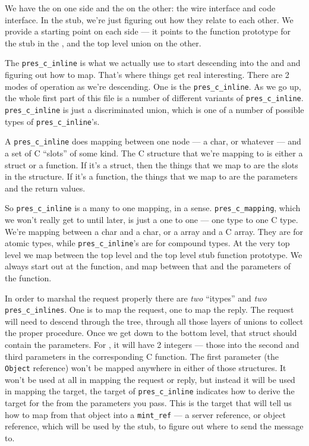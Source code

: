 We have the \MINT{} on one side and the \CAST{} on the other: the wire interface and
code interface.  In the stub, we're just figuring out how they relate to each
other.  We provide a starting point on each side --- it points to the function
prototype for the stub in the \CAST{}, and the \MINT{} top level union on the other.

The \texttt{pres\_c\_inline} is what we actually use to start descending into
the \MINT{} and \CAST{} and figuring out how to map.  That's where things get real
interesting.  There are 2 modes of operation as we're descending.  One is the
\texttt{pres\_c\_inline}.  As we go up, the whole first part of this file is a
number of different variants of \texttt{pres\_c\_inline}.
\texttt{pres\_c\_inline} is just a discriminated union, which is one of a
number of possible types of \texttt{pres\_c\_inline}'s.

A \texttt{pres\_c\_inline} does mapping between one \MINT{} node --- a \MINT{} char,
or whatever --- and a set of C ``slots'' of some kind.  The C structure that
we're mapping to is either a struct or a function.  If it's a struct, then the
things that we map to are the slots in the structure.  If it's a function, the
things that we map to are the parameters and the return values.

So \texttt{pres\_c\_inline} is a many to one mapping, in a sense.
\texttt{pres\_c\_mapping}, which we won't really get to until later, is just a
one to one --- one \MINT{} type to one C type.  We're mapping between a \MINT{} char
and a \CAST{} char, or a \MINT{} array and a C array.  They are for atomic types,
while \texttt{pres\_c\_inline}'s are for compound types.  At the very top level
we map between the top level \MINT{} and the top level stub function prototype.
We always start out at the function, and map between that and the parameters of
the function.

In order to marshal the request properly there are \emph{two} ``itypes'' and
\emph{two} \texttt{pres\_c\_inlines}.  One is to map the request, one to map
the reply.  The request will need to descend through the \MINT{} tree, through all
those layers of unions to collect the proper procedure.  Once we get down to
the bottom level, that struct should contain the parameters.  For \CORBA{}, it
will have 2 integers --- those into the second and third parameters in the
corresponding C function.  The first parameter (the \texttt{Object} reference)
won't be mapped anywhere in either of those structures.  It won't be used at
all in mapping the request or reply, but instead it will be used in mapping the
target, the target of \texttt{pres\_c\_inline} indicates how to derive the
target for the \RPC{} from the parameters you pass.  This is the target that will
tell us how to map from that object into a \texttt{mint\_ref} --- a server
reference, or object reference, which will be used by the stub, to figure out
where to send the message to.

